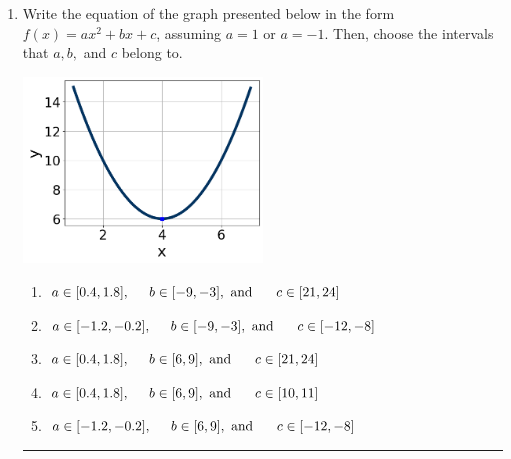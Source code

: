 \documentclass[14pt]{extbook}
\newcommand{\litem}[1]{\item#1\hspace*{-1cm}\rule{\textwidth}{0.4pt}}
\begin{document}
\begin{enumerate}
{\begin{enumerate}[label=\Alph*.]
\end{enumerate} }
\litem{
Write the equation of the graph presented below in the form $f(x)=ax^2+bx+c$, assuming  $a=1$ or $a=-1$. Then, choose the intervals that $a, b,$ and $c$ belong to.
\begin{center}
    \includegraphics[width=0.5\textwidth]{../Figures/quadraticGraphToEquationC.png}
\end{center}
\begin{enumerate}[label=\Alph*.]
\item \( a \in [0.4, 1.8], \hspace*{5mm} b \in [-9, -3], \text{ and } \hspace*{5mm} c \in [21, 24] \)
\item \( a \in [-1.2, -0.2], \hspace*{5mm} b \in [-9, -3], \text{ and } \hspace*{5mm} c \in [-12, -8] \)
\item \( a \in [0.4, 1.8], \hspace*{5mm} b \in [6, 9], \text{ and } \hspace*{5mm} c \in [21, 24] \)
\item \( a \in [0.4, 1.8], \hspace*{5mm} b \in [6, 9], \text{ and } \hspace*{5mm} c \in [10, 11] \)
\item \( a \in [-1.2, -0.2], \hspace*{5mm} b \in [6, 9], \text{ and } \hspace*{5mm} c \in [-12, -8] \)


\end{enumerate}}
\end{enumerate}
\end{document}
